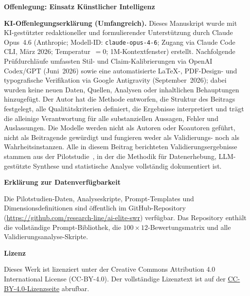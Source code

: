 \documentclass[11pt,a4paper]{article}
\newcommand{\backmatterlabel}[1]{%
  \par\smallskip
  \noindent\textbf{#1}\enspace
}
\begin{document}
\begingroup
\footnotesize
{}
\setlength{\parskip}{0pt}
\backmatterlabel{Offenlegung: Einsatz Künstlicher Intelligenz}

\noindent\textbf{KI-Offenlegungserklärung (Umfangreich).}
Dieses Manuskript wurde mit KI-gestützter redaktioneller und formulierender Unterstützung durch Claude Opus~4.6 (Anthropic; Modell-ID: \texttt{claude-opus-4-6}; Zugang via Claude Code CLI, März 2026; Temperatur~$= 0$; 1M-Kontextfenster) erstellt. Nachfolgende Prüfdurchläufe umfassten Stil- und Claim-Kalibrierungen via OpenAI Codex/GPT (Juni~2026) sowie eine automatisierte LaTeX-, PDF-Design- und typografische Verifikation via Google Antigravity (September~2026); dabei wurden keine neuen Daten, Quellen, Analysen oder inhaltlichen Behauptungen hinzugefügt. Der Autor hat die Methode entworfen, die Struktur des Beitrags festgelegt, alle Qualitätskriterien definiert, die Ergebnisse interpretiert und trägt die alleinige Verantwortung für alle substanziellen Aussagen, Fehler und Auslassungen. Die Modelle werden nicht als Autoren oder Koautoren geführt, nicht als Beitragende gewürdigt und fungieren weder als Validierungs- noch als Wahrheitsinstanzen. Alle in diesem Beitrag berichteten Validierungsergebnisse stammen aus der Pilotstudie~\citep{Geiger2026PaperA}, in der die Methodik für Datenerhebung, LLM-gestützte Synthese und statistische Analyse vollständig dokumentiert ist.


\backmatterlabel{Erklärung zur Datenverfügbarkeit}

\noindent Die Pilotstudien-Daten, Analyseskripte, Prompt-Templates und Dimensionsdefinitionen sind öffentlich im GitHub-Repository (\url{https://github.com/research-line/ai-elite-swr}) verfügbar. Das Repository enthält die vollständige Prompt-Bibliothek, die $100 \times 12$-Bewertungsmatrix und alle Validierungsanalyse-Skripte.


\backmatterlabel{Lizenz}

\noindent Dieses Werk ist lizenziert unter der Creative Commons Attribution 4.0 International License (CC-BY-4.0). Der vollständige Lizenztext ist auf der \href{https://creativecommons.org/licenses/by/4.0/}{CC-BY-4.0-Lizenzseite} abrufbar.
\endgroup
\end{document}
